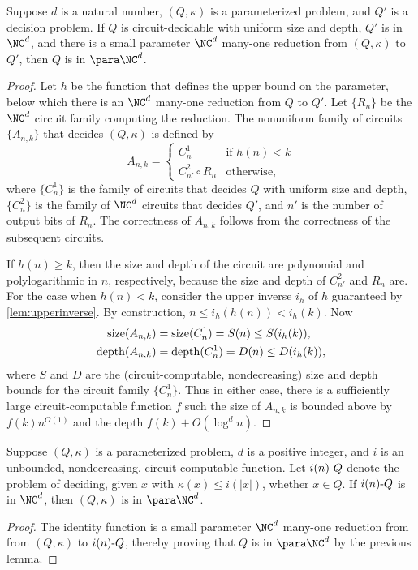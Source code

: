 \begin{lemma}\label{lem:spreduction}
  Suppose $d$ is a natural number, $(Q, \kappa)$ is a parameterized problem, and $Q'$ is a decision problem.
  If $Q$ is circuit-decidable with uniform size and depth, $Q'$ is in $\NC^d$, and there is a small parameter $\NC^d$ many-one reduction from $(Q, \kappa)$ to $Q'$, then $Q$ is in $\para \NC^d$.
\end{lemma}
\begin{proof}
  Let $h$ be the function that defines the upper bound on the parameter, below which there is an $\NC^d$ many-one reduction from $Q$ to $Q'$.
  Let $\{R_n\}$ be the $\NC^d$ circuit family computing the reduction.
  The nonuniform family of circuits $\{A_{n, k}\}$ that decides $(Q, \kappa)$ is defined by
  \[
  A_{n, k} =
  \begin{cases}
    C_n^1 & \text{if } h(n) < k \\
    C_{n'}^2 \circ R_{n} & \text{otherwise},
  \end{cases}
  \]
  where $\{C_n^1\}$ is the family of circuits that decides $Q$ with uniform size and depth, $\{C_n^2\}$ is the family of $\NC^d$ circuits that decides $Q'$, and $n'$ is the number of output bits of $R_n$.
  The correctness of $A_{n, k}$ follows from the correctness of the subsequent circuits.

  If $h(n) \geq k$, then the size and depth of the circuit are polynomial and polylogarithmic in $n$, respectively, because the size and depth of $C_{n'}^2$ and $R_n$ are.
  For the case when $h(n) < k$, consider the upper inverse $i_h$ of $h$ guaranteed by \autoref{lem:upperinverse}.
  By construction, $n \leq i_h(h(n)) < i_h(k)$.
  Now
  \begin{align*}
    \operatorname{size}(A_{n, k}) & = \operatorname{size}(C_n^1) = S(n) \leq S(i_h(k)), \\
    \operatorname{depth}(A_{n, k}) & = \operatorname{depth}(C_n^1) = D(n) \leq D(i_h(k)),
  \end{align*}
  where $S$ and $D$ are the (circuit-computable, nondecreasing) size and depth bounds for the circuit family $\{C_n^1\}$.
  Thus in either case, there is a sufficiently large circuit-computable function $f$ such the size of $A_{n, k}$ is bounded above by $f(k) n^{O(1)}$ and the depth $f(k) + O(\log^d n)$.
\end{proof}

\begin{corollary}\label{cor:sprself}
  Suppose $(Q, \kappa)$ is a parameterized problem, $d$ is a positive integer, and $i$ is an unbounded, nondecreasing, circuit-computable function.
  Let $i(n) \textnormal{-} Q$ denote the problem of deciding, given $x$ with $\kappa(x) \leq i(|x|)$, whether $x \in Q$.
  If $i(n) \textnormal{-} Q$ is in $\NC^d$, then $(Q, \kappa)$ is in $\para \NC^d$.
\end{corollary}
\begin{proof}
  The identity function is a small parameter $\NC^d$ many-one reduction from from $(Q, \kappa)$ to $i(n) \textnormal{-} Q$, thereby proving that $Q$ is in $\para \NC^d$ by the previous lemma.
\end{proof}

